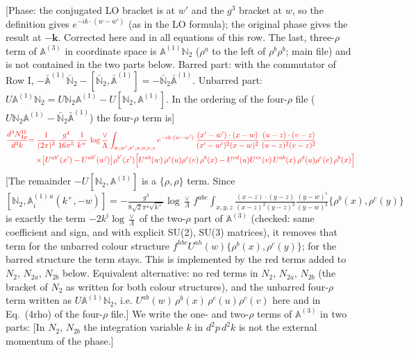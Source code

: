 \documentclass[9pt]{article}
\def\mf#1{\mathbb{#1}}
\numberwithin{equation}{section}
\begin{document}
{\color{red}[Phase: the conjugated LO bracket is at $w'$ and the $g^{3}$ bracket at $w$, so the definition gives $e^{-ik\cdot(w-w')}$ (as in the LO formula); the original phase gives the result at $-\mathbf{k}$. Corrected here and in all equations of this row. The last, three-$\rho$ term of $\mf{A}^{(3)}$ in coordinate space is $\mf{A}^{(1)}\mf{N}_{2}$ ($\rho^{a}$ to the left of $\rho^{b}\rho^{b}$; main file) and is not contained in the two parts below. Barred part: with the commutator of Row I, $-\bar{\mf{A}}^{(1)}\bar{\mf{N}}_{2}-[\bar{\mf{N}}_{2},\bar{\mf{A}}^{(1)}]=-\bar{\mf{N}}_{2}\bar{\mf{A}}^{(1)}$. Unbarred part: $U\mf{A}^{(1)}\mf{N}_{2}=U\mf{N}_{2}\mf{A}^{(1)}-U[\mf{N}_{2},\mf{A}^{(1)}]$. In the ordering of the four-$\rho$ file ($U\mf{N}_{2}\mf{A}^{(1)}-\bar{\mf{N}}_{2}\bar{\mf{A}}^{(1)}$) the four-$\rho$ term is]} \begin{align} {\color{red}\frac{d^{3}N^{\rm II}_{4\rho}}{d^{3}k}} & {\color{red}= \frac{1}{(2\pi)^{3}}\,\frac{g^{4}}{16\pi^{5}}\,\frac{1}{k^{+}}\,\log\frac{\vee}{\Lambda}\int_{w,w',x',x,u,v,z}e^{-ik\cdot(w-w')}\,\frac{(x'-w')\cdot(x-w)}{(x'-w')^{2}(x-w)^{2}}\,\frac{(u-z)\cdot(v-z)}{(u-z)^{2}(v-z)^{2}}} \notag \\ & {\color{red}\quad\times\big[U^{ab'}(x')-U^{ab'}(w')\big]\rho^{b'}(x')\Big[U^{ab}(w)\,\rho^{c}(u)\rho^{c}(v)\,\rho^{b}(x)-U^{cd}(u)U^{ce}(v)\,U^{ab}(x)\,\rho^{d}(u)\rho^{e}(v)\,\rho^{b}(x)\Big]} \notag \end{align} {\color{red}[The remainder $-U[\mf{N}_{2},\mf{A}^{(1)}]$ is a $\{\rho,\rho\}$ term. Since $[\mf{N}_{2},\mf{A}^{(1)\,a}_{i}(k^{+},-w)]=-\frac{g^{3}}{8\sqrt{2}\pi^{4}\sqrt{k^{+}}}\log\frac{\vee}{\Lambda}\,f^{abc}\int_{x,y,z}\frac{(x-z)\cdot(y-z)}{(x-z)^{2}(y-z)^{2}}\frac{(y-w)^{i}}{(y-w)^{2}}\{\rho^{b}(x),\rho^{c}(y)\}$ is exactly the term $-2k^{i}\log\frac{\vee}{\Lambda}$ of the two-$\rho$ part of $\mf{A}^{(3)}$ (checked: same coefficient and sign, and with explicit SU(2), SU(3) matrices), it removes that term for the unbarred colour structure $f^{hbc}U^{ah}(w)\{\rho^{b}(x),\rho^{c}(y)\}$; for the barred structure the term stays. This is implemented by the red terms added to $N_{2}$, $N_{2a}$, $N_{2b}$ below. Equivalent alternative: no red terms in $N_{2}$, $N_{2a}$, $N_{2b}$ (the bracket of $N_{2}$ as written for both colour structures), and the unbarred four-$\rho$ term written as $U\mf{A}^{(1)}\mf{N}_{2}$, i.e. $U^{ab}(w)\,\rho^{b}(x)\,\rho^{c}(u)\rho^{c}(v)$ here and in Eq.~(4rho) of the four-$\rho$ file.]} We write {\color{red}the one- and two-$\rho$ terms of $\mf{A}^{(3)}$} in two parts: {\color{red}[In $N_{2}$, $N_{2b}$ the integration variable $k$ in $d^{2}p\,d^{2}k$ is not the external momentum of the phase.]}
\end{document}
